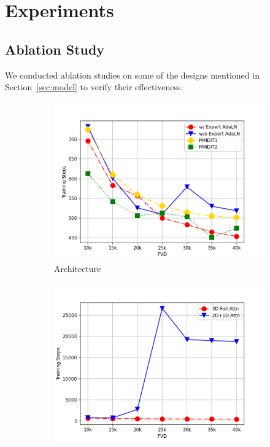 \section{Experiments}

\subsection{Ablation Study}
We conducted ablation studies on some of the designs mentioned in Section~\ref{sec:model} to verify their effectiveness.

\begin{figure}[h]
    \centering
    \begin{subfigure}[b]{0.32\textwidth}
        \includegraphics[width=\textwidth]{images/fvd-expert.png}
        \caption{Architecture}
        \label{fig:fvd-expert}
    \end{subfigure}
    \begin{subfigure}[b]{0.32\textwidth}
        \includegraphics[width=\textwidth]{images/fvd-attn.png}

\end{subfigure}
\end{figure}
